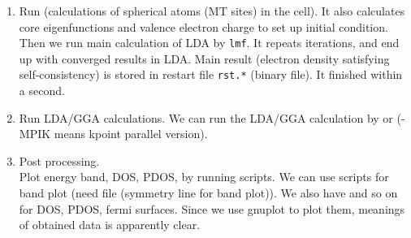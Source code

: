 \begin{enumerate}
\item Run  (calculations of spherical atoms (MT sites) in the cell). 
       It also calculates core eigenfunctions and valence electron charge
      to set up initial condition. Then we run main calculation of LDA by \verb+lmf+.
      It repeats iterations, and end up with converged results in LDA. Main result
      (electron density satisfying self-consistency) is stored in
      restart file \verb+rst.*+ (binary file).
      It finished within a second.

\item Run LDA/GGA calculations. 
      We can run the LDA/GGA calculation by  or 
      (-MPIK means kpoint parallel version).

\item Post processing.\\
      Plot energy band, DOS, PDOS, by running scripts.
      We can use scripts  for 
      band plot (need  file (symmetry line for band plot)).
      We also have  and so on for
      DOS, PDOS, fermi surfaces. 
      Since we use gnuplot to plot them, meanings of obtained data is
      apparently clear.

\end{enumerate}




